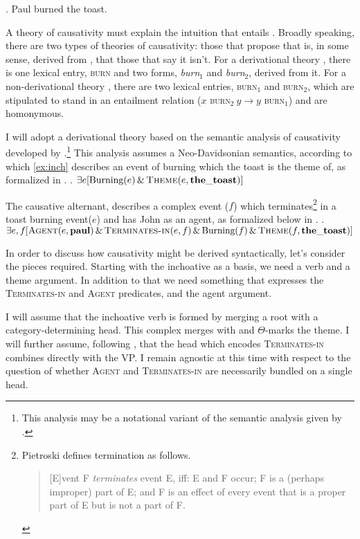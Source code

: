 \documentclass[letterpaper,12pt]{article}
\begin{document}
\ex.\label{ex:caus} Paul burned the toast.

A theory of causativity must explain the intuition that \Last entails \LLast.
Broadly speaking, there are two types of theories of causativity: those that propose that \Last is, in some sense, derived from \LLast, that those that say it isn't.
For a derivational theory \parencite[e.g.][]{lakoff1976toward,hale1993argument,pietroski2003small}, there is one lexical entry, \textsc{burn} and two forms, \textit{burn}$_1$ and \textit{burn}$_2$, derived from it.
For a non-derivational theory \parencite[e.g.][]{fodor1970three}, there are two lexical entries, \textsc{burn}$_1$ and \textsc{burn$_2$}, which are stipulated to stand in an entailment relation ($x$ \textsc{burn}$_2\: y \rightarrow y$ \textsc{burn}$_1$) and are homonymous.

I will adopt a derivational theory based on the semantic analysis of causativity developed by \textcite{pietroski2003small}.\footnote{
  This analysis may be a notational variant of the semantic analysis given by \textcite{kratzer_building_2004}.
}
This analysis assumes a Neo-Davidsonian semantics, according to which \ref{ex:inch} describes an event of burning which the toast is the theme of, as formalized in \Next.
\ex. $\exists e [\text{Burning}(e)\, \&\, \textsc{Theme}(e, \mathbf{the\_toast})]$

The causative alternant, describes a complex event ($f$) which terminates\footnote{
  Pietroski defines termination as follows.
\begin{quote}
  [E]vent F \textit{terminates} event E, iff: E and F occur; F is a (perhaps improper) part of E; and F is an effect of every event that is a proper part of E but is not a part of F.\hfill\parencite[p190]{pietroski2003small}
\end{quote}
} in a toast burning event($e$) and has John as an agent, as formalized below in \Next.
\ex. $\exists e,f [ \textsc{Agent}(e, \mathbf{paul}) \,\&\, \textsc{Terminates-in}(e, f) \,\&\,\text{Burning}(f)\, \&\, \textsc{Theme}(f, \mathbf{the\_toast})]$

In order to discuss how causativity might be derived syntactically, let's consider the pieces required.
Starting with the inchoative as a basis, we need a verb and a theme argument.
In addition to that we need something that expresses the \textsc{Terminates-in} and \textsc{Agent} predicates, and the agent argument.

I will assume that the inchoative verb is formed by merging a root with a category-determining head.
This complex merges with and $\Theta$-marks the theme.
I will further assume, following \textcite{pietroski2003small}, that the head which encodes \textsc{Terminates-in} combines directly with the VP.
I remain agnostic at this time with respect to the question of whether \textsc{Agent} and \textsc{Terminates-in} are necessarily bundled on a single head.
\end{document}
